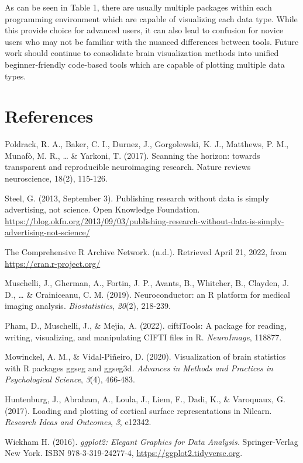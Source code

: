 \documentclass{article}
\begin{document}
As can be seen in Table 1, there are usually multiple packages within each programming environment which are capable of visualizing each data type. While this provide choice for advanced users, it can also lead to confusion for novice users who may not be familiar with the nuanced differences between tools. Future work should continue to consolidate brain visualization methods into unified beginner-friendly code-based tools which are capable of plotting multiple data types.

\newpage

\hypertarget{references}{%
\section{References}\label{references}}

Poldrack, R. A., Baker, C. I., Durnez, J., Gorgolewski, K. J., Matthews, P. M., Munafò, M. R., \ldots{} \& Yarkoni, T. (2017). Scanning the horizon: towards transparent and reproducible neuroimaging research. Nature reviews neuroscience, 18(2), 115-126.

Steel, G. (2013, September 3). Publishing research without data is simply advertising, not science. Open Knowledge Foundation. \url{https://blog.okfn.org/2013/09/03/publishing-research-without-data-is-simply-advertising-not-science/}

The Comprehensive R Archive Network. (n.d.). Retrieved April 21, 2022, from \url{https://cran.r-project.org/}

Muschelli, J., Gherman, A., Fortin, J. P., Avants, B., Whitcher, B., Clayden, J. D., \ldots{} \& Crainiceanu, C. M. (2019). Neuroconductor: an R platform for medical imaging analysis. \emph{Biostatistics}, \emph{20}(2), 218-239.

Pham, D., Muschelli, J., \& Mejia, A. (2022). ciftiTools: A package for reading, writing, visualizing, and manipulating CIFTI files in R. \emph{NeuroImage}, 118877.

Mowinckel, A. M., \& Vidal-Piñeiro, D. (2020). Visualization of brain statistics with R packages ggseg and ggseg3d. \emph{Advances in Methods and Practices in Psychological Science}, \emph{3}(4), 466-483.

Huntenburg, J., Abraham, A., Loula, J., Liem, F., Dadi, K., \& Varoquaux, G. (2017). Loading and plotting of cortical surface representations in Nilearn. \emph{Research Ideas and Outcomes}, \emph{3}, e12342.

Wickham H. (2016). \emph{ggplot2: Elegant Graphics for Data Analysis.} Springer-Verlag New York. ISBN 978-3-319-24277-4, \url{https://ggplot2.tidyverse.org}.
\end{document}
